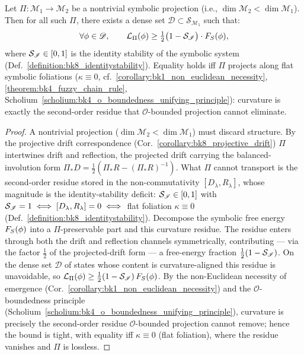 \begin{theorem}
\label{theorem:bk8_no_free_projection}
Let $\Pi : \mathcal{M}_1 \to \mathcal{M}_2$ be a nontrivial symbolic projection (i.e., $\dim \mathcal{M}_2 < \dim \mathcal{M}_1$).  
Then for all such $\Pi$, there exists a dense set $\mathscr{D} \subset \mathscr{S}_{\mathcal{M}_1}$ such that:
\[
\forall \phi \in \mathscr{D}, \qquad 
\mathcal{L}_\Pi(\phi) \ge \tfrac{1}{2} \bigl(1 - \mathcal{S}_{\mathscr{I}}\bigr) \cdot F_S(\phi),
\]
where $\mathcal{S}_{\mathscr{I}} \in [0,1]$ is the identity stability of the symbolic system (Def.~\ref{definition:bk8_identitystability}).
Equality holds iff $\Pi$ projects along flat symbolic foliations ($\kappa \equiv 0$, cf.~\ref{corollary:bk1_non_euclidean_necessity}, \ref{theorem:bk4_fuzzy_chain_rule}, Scholium~\ref{scholium:bk4_o_boundedness_unifying_principle}): curvature is exactly the second-order residue that $\mathcal{O}$-bounded projection cannot eliminate.
\end{theorem}
\begin{proof}
\label{proof:bk8_no_free_projection}
\leavevmode
A nontrivial projection ($\dim\mathcal{M}_2<\dim\mathcal{M}_1$) must discard structure. By the projective drift correspondence (Cor.~\ref{corollary:bk8_projective_drift}) $\Pi$ intertwines drift and reflection, the projected drift carrying the balanced-involution form $\Pi_*D=\tfrac12(\Pi_*R-(\Pi_*R)^{-1})$. What $\Pi$ cannot transport is the second-order residue stored in the non-commutativity $[D_\lambda,R_\lambda]$, whose magnitude is the identity-stability deficit: $\mathcal{S}_{\mathscr{I}}\in[0,1]$ with $\mathcal{S}_{\mathscr{I}}=1\iff[D_\lambda,R_\lambda]=0\iff$ flat foliation $\kappa\equiv 0$ (Def.~\ref{definition:bk8_identitystability}). Decompose the symbolic free energy $F_S(\phi)$ into a $\Pi$-preservable part and this curvature residue. The residue enters through both the drift and reflection channels symmetrically, contributing --- via the factor $\tfrac12$ of the projected-drift form --- a free-energy fraction $\tfrac12(1-\mathcal{S}_{\mathscr{I}})$. On the dense set $\mathscr{D}$ of states whose content is curvature-aligned this residue is unavoidable, so $\mathcal{L}_\Pi(\phi)\ge\tfrac12(1-\mathcal{S}_{\mathscr{I}})\,F_S(\phi)$. By the non-Euclidean necessity of emergence (Cor.~\ref{corollary:bk1_non_euclidean_necessity}) and the $\mathcal{O}$-boundedness principle (Scholium~\ref{scholium:bk4_o_boundedness_unifying_principle}), curvature is precisely the second-order residue $\mathcal{O}$-bounded projection cannot remove; hence the bound is tight, with equality iff $\kappa\equiv 0$ (flat foliation), where the residue vanishes and $\Pi$ is lossless.
\end{proof}
